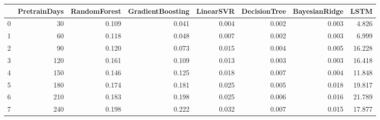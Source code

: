 \begin{tabular}{lrrrrrrr}
\toprule
{} &  PretrainDays &  RandomForest &  GradientBoosting &  LinearSVR &  DecisionTree &  BayesianRidge &   LSTM \\
\midrule
0 &            30 &         0.109 &             0.041 &      0.004 &         0.002 &          0.003 &  4.826 \\
1 &            60 &         0.118 &             0.048 &      0.007 &         0.002 &          0.003 &  6.999 \\
2 &            90 &         0.120 &             0.073 &      0.015 &         0.004 &          0.005 & 16.228 \\
3 &           120 &         0.161 &             0.109 &      0.013 &         0.003 &          0.003 & 16.418 \\
4 &           150 &         0.146 &             0.125 &      0.018 &         0.007 &          0.004 & 11.848 \\
5 &           180 &         0.174 &             0.181 &      0.025 &         0.005 &          0.018 & 19.817 \\
6 &           210 &         0.183 &             0.198 &      0.025 &         0.006 &          0.016 & 21.789 \\
7 &           240 &         0.198 &             0.222 &      0.032 &         0.007 &          0.015 & 17.877 \\
\bottomrule
\end{tabular}
